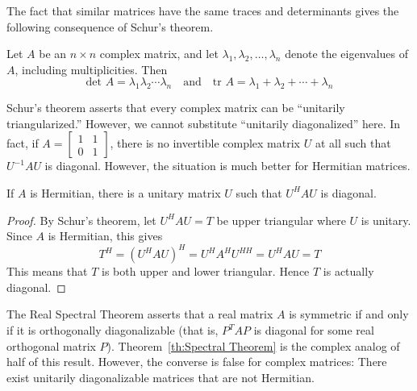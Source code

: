 \documentclass{ximera}
\begin{document}
The fact that similar matrices have the same traces and determinants gives the following consequence of Schur's theorem.

\begin{corollary}\label{cor:025850}
Let $A$ be an $n \times n$ complex matrix, and let $\lambda_{1}, \lambda_{2}, \ldots, \lambda_{n}$ denote the eigenvalues of $A$, including multiplicities. Then
\begin{equation*}
\mbox{det }A = \lambda_1\lambda_2 \cdots \lambda_n \quad \mbox{and} \quad \mbox{tr }A = \lambda_1 + \lambda_2 + \cdots + \lambda_n
\end{equation*}
\end{corollary}

Schur's theorem asserts that every
complex matrix can be ``unitarily triangularized.'' However, we cannot
substitute ``unitarily diagonalized'' here. In fact, if $A = \left[ \begin{array}{cc}
1 & 1 \\
0 & 1
\end{array}\right]$, there is no invertible complex matrix $U$ at all such that $U^{-1}AU$ is diagonal. However, the situation is much better for Hermitian matrices.


\begin{theorem}\label{th:Spectral Theorem}
If $A$ is Hermitian, there is a unitary matrix $U$ such that $U^{H}AU$ is diagonal.
\end{theorem}

\begin{proof}
By Schur's theorem, let $U^{H}AU = T$ be upper triangular where $U$ is unitary. Since $A$ is Hermitian, this gives
\begin{equation*}
T^H = (U^HAU)^H = U^HA^HU^{HH} = U^HAU = T
\end{equation*}
This means that $T$ is both upper and lower triangular. Hence $T$ is actually diagonal.
\end{proof}

The Real Spectral Theorem asserts that a real matrix $A$ is symmetric if and only if it is orthogonally diagonalizable (that is, $P^{T}AP$ is diagonal for some real orthogonal matrix $P$). Theorem~\ref{th:Spectral Theorem}
 is the complex analog of half of this result. However, the converse is
false for complex matrices: There exist unitarily diagonalizable
matrices that are not Hermitian.
\end{document}
